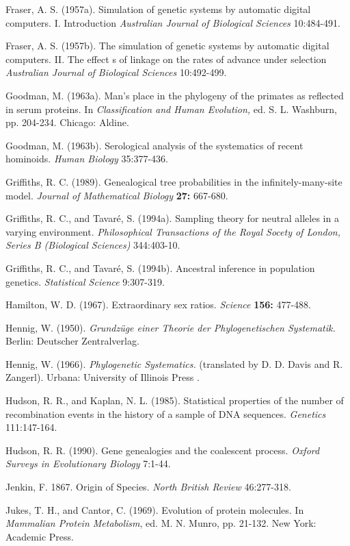\documentclass[12pt]{article}
\begin{document}
{Fraser, A. S. (1957a).
Simulation of genetic systems by automatic digital computers. I. Introduction
{\it Australian Journal of Biological Sciences}  10:484-491.

Fraser, A. S. (1957b).
The simulation of genetic systems by automatic digital computers. II. The effect
s of linkage on the rates of advance under selection
{\it Australian Journal of Biological Sciences}  10:492-499.

Goodman, M.  (1963a).  Man's place in the phylogeny of the primates as reflected
in serum proteins.  In {\it Classification and Human Evolution,}
ed. S. L. Washburn, pp. 204-234.  Chicago: Aldine.

Goodman, M. (1963b).  Serological analysis of the systematics of recent
hominoids.  {\it Human Biology}  35:377-436.

Griffiths, R. C.  (1989).  Genealogical tree probabilities in the
infinitely-many-site model.  {\it Journal of Mathematical Biology} {\bf 27:}
667-680.

Griffiths, R. C., and Tavar\'e, S.  (1994a).
Sampling theory for neutral alleles in a varying environment.
{\it Philosophical Transactions of the Royal Socety of London, Series B (Biological Sciences)}  344:403-10.

Griffiths, R. C., and Tavar\'e, S.  (1994b).  Ancestral inference in population
genetics.  {\it Statistical Science}  9:307-319.

Hamilton, W. D. (1967).  Extraordinary sex ratios. {\it Science} {\bf 156:}
477-488.

Hennig, W. (1950).  {\it Grundz\"uge einer Theorie der Phylogenetischen Systematik.}
Berlin: Deutscher Zentralverlag.

Hennig, W.  (1966). {\it Phylogenetic Systematics.}
(translated by D. D. Davis and R. Zangerl). Urbana: University of Illinois Press
.

Hudson, R. R., and Kaplan, N. L. (1985). Statistical properties of the number
of recombination events in the history of a sample of DNA sequences.
{\it Genetics}  111:147-164.

Hudson, R. R.  (1990).  Gene genealogies and the coalescent process.
{\it Oxford Surveys in Evolutionary Biology}  7:1-44.

Jenkin, F.  1867.
Origin of Species. {\it North British Review}  46:277-318.

Jukes, T. H., and  Cantor, C. (1969).  Evolution of protein molecules. 
In {\it Mammalian Protein Metabolism}, ed. M. N. Munro, pp. 21-132. New York: Academic
Press.

}
\end{document}
